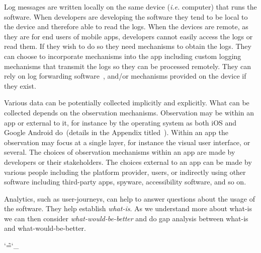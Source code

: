 Log messages are written locally on the same device (\textit{i.e.} computer) that runs the software. When developers are developing the software they tend to be local to the device and therefore able to read the logs. When the devices are remote, as they are for end users of mobile apps, developers cannot easily access the logs or read them. If they wish to do so they need mechanisms to obtain the logs. They can choose to incorporate mechanisms into the app including custom logging mechanisms that transmit the logs so they can be processed remotely. They can rely on log forwarding software~, and/or mechanisms provided on the device if they exist.


Various data can be potentially collected implicitly and explicitly. What can be collected depends on the observation mechanisms. Observation may be within an app or external to it, for instance by the operating system as both iOS  and Google Android do~(details in the Appendix titled~\href{chapter-on-mobile-analytics}{\emph{}}). Within an app the observation may focus at a single layer, for instance the visual user interface, or several. The choices of observation mechanisms within an app are made by developers or their stakeholders. The choices external to an app can be made by various people including the platform provider, users, or indirectly using other software including third-party apps, spyware, accessibility software, and so on.

Analytics, such as user-journeys, can help to answer questions about the usage of the software. They help establish \emph{what-is}. As we understand more about what-is we can then consider \emph{what-would-be-better} and do gap analysis between what-is and what-would-be-better.

\makeatletter
\DeclareRobustCommand*{\escapeus}[1]{%
    \begingroup\@activeus\scantokens{#1\endinput}\endgroup}
\begingroup\lccode`\~=`\_\relax
    \lowercase{\endgroup\def\@activeus{\catcode`\_=\active \let~\_}}
\makeatother

